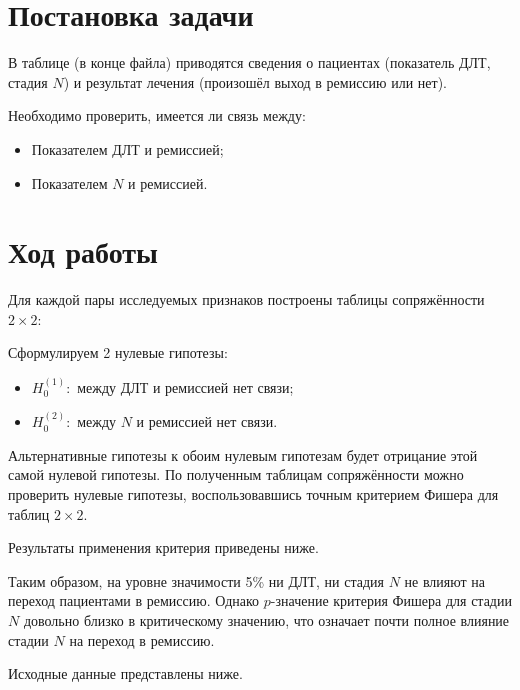 \section{Постановка задачи}

В таблице (в конце файла) приводятся сведения о пациентах (показатель ДЛТ, стадия $N$) и результат лечения (произошёл выход в ремиссию или нет).

Необходимо проверить, имеется ли связь между:

\begin{itemize}
	\item Показателем ДЛТ и ремиссией;
	\item Показателем $N$ и ремиссией.
\end{itemize}

\section{Ход работы}

Для каждой пары исследуемых признаков построены таблицы сопряжённости $2 \times 2$:


Сформулируем 2 нулевые гипотезы:

\begin{itemize}
	\item $H_0^{(1)}:$ между ДЛТ и ремиссией нет связи;
	\item $H_0^{(2)}:$ между $N$ и ремиссией нет связи.
\end{itemize}

Альтернативные гипотезы к обоим нулевым гипотезам будет отрицание этой самой нулевой гипотезы. По полученным таблицам сопряжённости можно проверить нулевые гипотезы, воспользовавшись точным критерием Фишера для таблиц $2 \times 2$.

Результаты применения критерия приведены ниже.


Таким образом, на уровне значимости 5\% ни ДЛТ, ни стадия $N$ не влияют на переход пациентами в ремиссию. Однако $p$-значение критерия Фишера для стадии $N$ довольно близко в критическому значению, что означает почти полное влияние стадии $N$ на переход в ремиссию.

Исходные данные представлены ниже.

